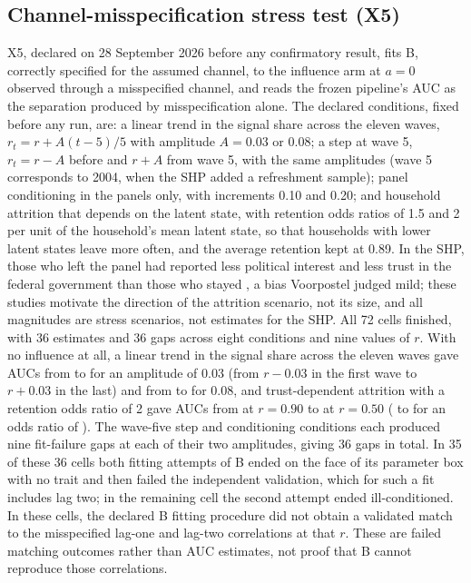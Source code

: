 \subsection{Channel-misspecification stress test (X5)}\label{sec:x5}\label{supp:x5}
X5, declared on 28 September 2026 before any confirmatory result, fits B, correctly specified for the assumed channel, to the influence arm at $a=0$ observed through a misspecified channel, and reads the frozen pipeline's AUC as the separation produced by misspecification alone. %
The declared conditions, fixed before any run, are: a linear trend in the signal share across the eleven waves, $r_t=r+A(t-5)/5$ with amplitude $A=0.03$ or 0.08; a step at wave 5, $r_t=r-A$ before and $r+A$ from wave 5, with the same amplitudes (wave 5 corresponds to 2004, when the SHP added a refreshment sample); panel conditioning in the panels only, with increments 0.10 and 0.20; and household attrition that depends on the latent state, with retention odds ratios of 1.5 and 2 per unit of the household's mean latent state, so that households with lower latent states leave more often, and the average retention kept at 0.89. In the SHP, those who left the panel had reported less political interest and less trust in the federal government than those who stayed \cite{lipps2007,voorpostel2010}, a bias Voorpostel judged mild; these studies motivate the direction of the attrition scenario, not its size, and all magnitudes are stress scenarios, not estimates for the SHP.
All 72 cells finished, with 36 estimates and 36 gaps across eight conditions and nine values of $r$. %
With no influence at all, a linear trend in the signal share across the eleven waves gave AUCs from  to  for an amplitude of 0.03 (from $r-0.03$ in the first wave to $r+0.03$ in the last) and from  to  for 0.08, and trust-dependent attrition with a retention odds ratio of 2 gave AUCs from  at $r=0.90$ to  at $r=0.50$ ( to  for an odds ratio of ). %
The wave-five step and conditioning conditions each produced nine fit-failure gaps at each of their two amplitudes, giving 36 gaps in total. %
In 35 of these 36 cells both fitting attempts of B ended on the face of its parameter box with no trait and then failed the independent validation, which for such a fit includes lag two; in the remaining cell the second attempt ended ill-conditioned. In these cells, the declared B fitting procedure did not obtain a validated match to the misspecified lag-one and lag-two correlations at that $r$. These are failed matching outcomes rather than AUC estimates, not proof that B cannot reproduce those correlations.

